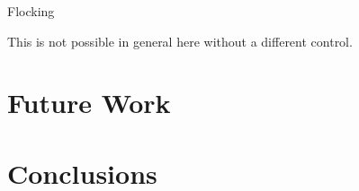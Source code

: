 \documentclass[10pt, conference, compsocconf]{IEEEtran}
\begin{document}
\begin{inv}Flocking

This is not possible in general here without a different control.

\end{inv}


\section{Future Work}
\label{sec:future}

\section{Conclusions}
\label{sec:conclusion}

\label{sec:references}


\end{document}
